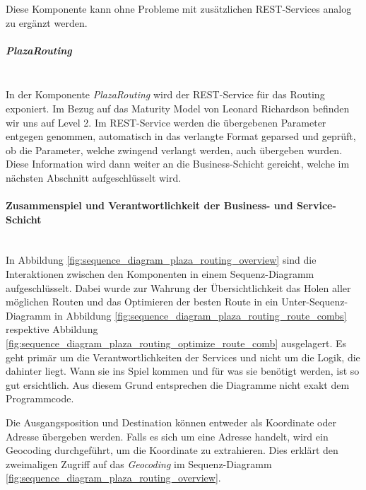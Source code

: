 Diese Komponente kann ohne Probleme mit zusätzlichen \ac{REST}-Services analog zu  ergänzt werden.

\subparagraph{PlazaRouting}\label{impl:PlazaRouting}~\\
In der Komponente \emph{PlazaRouting} wird der \ac{REST}-Service für das Routing exponiert. Im Bezug auf das Maturity Model \cite{maturity_model} von Leonard Richardson befinden wir uns auf Level 2. Im \ac{REST}-Service werden die übergebenen Parameter entgegen genommen, automatisch in das verlangte Format geparsed und geprüft, ob die Parameter, welche zwingend verlangt werden, auch übergeben wurden. Diese Information wird dann weiter an die Business-Schicht gereicht, welche im nächsten Abschnitt aufgeschlüsselt wird.

\paragraph{Zusammenspiel und Verantwortlichkeit der Business- und Service-Schicht}\label{impl:Plaza Routing Zusammenspielund Verantwortlichkeit der Business- und Service-Schicht}~\\
In Abbildung \ref{fig:sequence_diagram_plaza_routing_overview} sind die Interaktionen zwischen den Komponenten in einem Sequenz-Diagramm aufgeschlüsselt. Dabei wurde zur Wahrung der Übersichtlichkeit das Holen aller möglichen Routen und das Optimieren der besten Route in ein Unter-Sequenz-Diagramm in Abbildung \ref{fig:sequence_diagram_plaza_routing_route_combs} respektive Abbildung \ref{fig:sequence_diagram_plaza_routing_optimize_route_comb} ausgelagert. Es geht primär um die Verantwortlichkeiten der Services und nicht um die Logik, die dahinter liegt. Wann sie ins Spiel kommen und für was sie benötigt werden, ist so gut ersichtlich. Aus diesem Grund entsprechen die Diagramme nicht exakt dem Programmcode. 

Die Ausgangsposition und Destination können entweder als Koordinate oder Adresse übergeben werden. Falls es sich um eine Adresse handelt, wird ein \gls{Geocoding} durchgeführt, um die Koordinate zu extrahieren. Dies erklärt den zweimaligen Zugriff auf das \emph{Geocoding} im Sequenz-Diagramm \ref{fig:sequence_diagram_plaza_routing_overview}.

